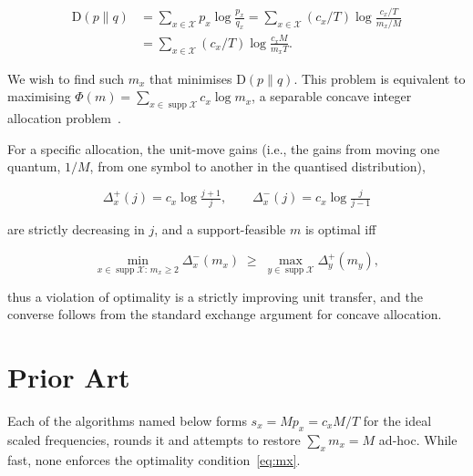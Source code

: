 \documentclass[final,5p]{elsarticle}
\DeclareMathOperator{\supp}{supp}
\begin{document}
\begin{equation}
\begin{aligned}
\mathrm D(p \| q) &= \sum_{x \in \mathcal X} p_x \log \frac{p_x}{q_x} = \sum_{x \in \mathcal X} (c_x / T) \log \frac{c_x / T}{m_x / M}\\
&= \sum_{x \in \mathcal X} (c_x / T) \log \frac{c_x M}{m_x T}.
\end{aligned}
\end{equation}

We wish to find such $m_x$ that minimises $\mathrm D(p \| q)$. This problem is equivalent to maximising $\Phi(m) = \sum_{x \in \supp \mathcal X} c_x \log m_x$, a separable concave integer allocation problem~\cite{FedergruenGroenevelt1986,Hochbaum1994}.

For a specific allocation, the unit-move gains (i.e., the gains from moving one quantum, $1/M$, from one symbol to another in the quantised distribution),

\begin{equation}
   \Delta^+_x(j)=c_x\log\tfrac{j+1}{j},\qquad
   \Delta^-_x(j)=c_x\log\tfrac{j}{j-1}
\end{equation}

are strictly decreasing in $j$, and a support-feasible $m$ is optimal iff

\begin{equation}\label{eq:mx}
   \min_{x\in \supp \mathcal{X}:\,m_x\ge2}\Delta^-_x(m_x)\;\ge\;
   \max_{y\in \supp \mathcal{X}}\Delta^+_y(m_y),
\end{equation}

thus a violation of optimality is a strictly improving unit transfer, and the converse follows from the standard exchange argument for concave allocation.

\section{Prior Art}

Each of the algorithms named below forms $s_x = Mp_x = c_x M / T$ for the ideal scaled frequencies, rounds it and attempts to restore $\sum_x m_x = M$ ad-hoc. While fast, none enforces the optimality condition~\eqref{eq:mx}.
\end{document}
